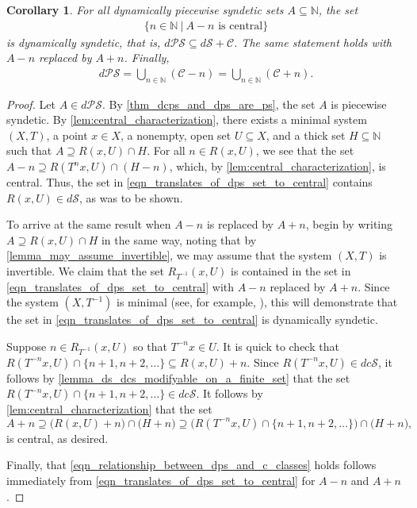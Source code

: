 \documentclass[letter,11pt]{article}
\theoremstyle{plain}
\newtheorem{corollary}[theorem]{Corollary}
\theoremstyle{definition}
\theoremstyle{plain}
\theoremstyle{plain}
\numberwithin{equation}{section}
\newcommand{\N}{\mathbb{N}}
\newcommand{\dsyndetic}{d\mathcal{S}}
\newcommand{\dcsyndetic}{dc\mathcal{S}}
\newcommand{\dPS}{d\mathcal{PS}}
\newcommand{\central}{\mathcal{C}}
\begin{document}
\begin{corollary}
\label{thm:relations_translates_of_dps_to_central}
    For all dynamically piecewise syndetic sets $A \subseteq \N$, the set
    \begin{align}
        \label{eqn_translates_of_dps_set_to_central}
        \big\{ n \in \N \ \big| \ A-n \text{ is central} \big\}
    \end{align}
    is dynamically syndetic, that is, $\dPS \subseteq \dsyndetic + \central$. The same statement holds with $A-n$ replaced by $A+n$. Finally,
    \begin{align}
        \label{eqn_relationship_between_dps_and_c_classes}
        \dPS = \bigcup_{n \in \N} (\central - n) = \bigcup_{n \in \N} (\central + n).
    \end{align}
        
\end{corollary}

\begin{proof}
    Let $A \in \dPS$.  By \cref{thm_dcps_and_dps_are_ps}, the set $A$ is piecewise syndetic.  By \cref{lem:central_characterization}, there exists a minimal system $(X,T)$, a point $x \in X$, a nonempty, open set $U \subseteq X$, and a thick set $H \subseteq \N$ such that $A \supseteq R(x,U) \cap H$.  For all $n \in R(x,U)$, we see that the set $A - n \supseteq R(T^n x, U) \cap (H-n)$, which, by \cref{lem:central_characterization}, is central.  Thus, the set in \eqref{eqn_translates_of_dps_set_to_central} contains $R(x,U) \in \dsyndetic$, as was to be shown.

    To arrive at the same result when $A-n$ is replaced by $A+n$, begin by writing $A \supseteq R(x,U) \cap H$ in the same way, noting that by \cref{lemma_may_assume_invertible}, we may assume that the system $(X,T)$ is invertible. We claim that the set $R_{T^{-1}}(x,U)$ is contained in the set in \eqref{eqn_translates_of_dps_set_to_central} with $A-n$ replaced by $A+n$.  Since the system $(X,T^{-1})$ is minimal (see, for example, \cite[Lemma 2.7]{glasscock_koutsogiannis_richter_2019}), this will demonstrate that the set in \eqref{eqn_translates_of_dps_set_to_central} is dynamically syndetic.
    
    Suppose $n \in R_{T^{-1}}(x,U)$ so that $T^{-n} x \in U$.  It is quick to check that $R(T^{-n}x,U) \cap \{n+1, n+2, \ldots\} \subseteq R(x,U) + n$.  Since $R(T^{-n}x,U) \in \dcsyndetic$, it follows by \cref{lemma_ds_dcs_modifyable_on_a_finite_set} that the set $R(T^{-n}x,U) \cap \{n+1, n+2, \ldots\} \in \dcsyndetic$. It follows by \cref{lem:central_characterization} that the set
    \[A + n \supseteq \big(R(x,U) + n\big) \cap \big(H + n\big) \supseteq \big(R(T^{-n}x,U) \cap \{n+1, n+2, \ldots\}\big) \cap \big(H + n\big),\]
    is central, as desired.

    Finally, that \eqref{eqn_relationship_between_dps_and_c_classes} holds follows immediately from \eqref{eqn_translates_of_dps_set_to_central} for $A-n$ and $A+n$.
\end{proof}
\end{document}
